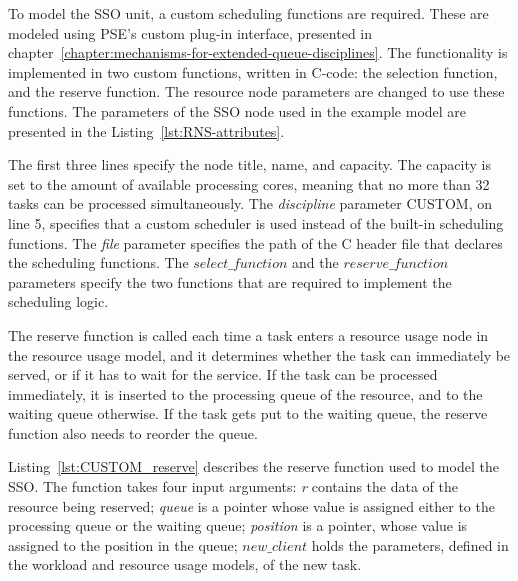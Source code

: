 To model the SSO unit, a custom scheduling functions are required. These are modeled using PSE's custom plug-in interface, presented in chapter~\ref{chapter:mechanisms-for-extended-queue-disciplines}. The functionality is implemented in two custom functions, written in C-code: the selection function, and the reserve function. The resource node parameters are changed to use these functions. The parameters of the SSO node used in the example model are presented in the Listing~\ref{lst:RNS-attributes}.



The first three lines specify the node title, name, and capacity. The capacity is set to the amount of available processing cores, meaning that no more than 32 tasks can be processed simultaneously. The \emph{discipline} parameter \mbox{CUSTOM}, on line 5, specifies that a custom scheduler is used instead of the built-in scheduling functions. The \emph{file} parameter specifies the path of the C header file that declares the scheduling functions. The \emph{$select\_function$} and the \emph{$reserve\_function$} parameters specify the two functions that are required to implement the scheduling logic.

The reserve function is called each time a task enters a resource usage node in the resource usage model, and it determines whether the task can immediately be served, or if it has to wait for the service. If the task can be processed immediately, it is inserted to the processing queue of the resource, and to the waiting queue otherwise. If the task gets put to the waiting queue, the reserve function also needs to reorder the queue.

Listing~\ref{lst:CUSTOM_reserve} describes the reserve function used to model the SSO. The function takes four input arguments: \emph{r} contains the data of the resource being reserved; \emph{queue} is a pointer whose value is assigned either to the processing queue or the waiting queue; \emph{position} is a pointer, whose value is assigned to the position in the queue; \emph{$new\_client$} holds the parameters, defined in the workload and resource usage models, of the new task.



